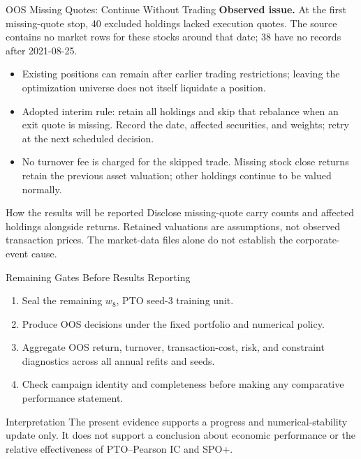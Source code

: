 \documentclass[aspectratio=169,xcolor=dvipsnames]{beamer}
\begin{document}
\begin{frame}{OOS Missing Quotes: Continue Without Trading}
    \small
    \textbf{Observed issue.} At the first missing-quote stop, 40 excluded
    holdings lacked execution quotes. The source contains no market rows for
    these stocks around that date; 38 have no records after 2021-08-25.
    \vspace{2pt}
    \begin{itemize}
        \item Existing positions can remain after earlier trading restrictions;
        leaving the optimization universe does not itself liquidate a position.
        \item Adopted interim rule: retain all holdings and skip that rebalance
        when an exit quote is missing. Record the date, affected securities,
        and weights; retry at the next scheduled decision.
        \item No turnover fee is charged for the skipped trade. Missing stock
        close returns retain the previous asset valuation; other holdings
        continue to be valued normally.
    \end{itemize}
    \vspace{2pt}
    \begin{block}{How the results will be reported}
    Disclose missing-quote carry counts and affected holdings alongside returns.
    Retained valuations are assumptions, not observed transaction prices.
    The market-data files alone do not establish the corporate-event cause.
    \end{block}
\end{frame}

\begin{frame}{Remaining Gates Before Results Reporting}
    \small
    \begin{enumerate}
        \item Seal the remaining $w_8$, PTO seed-3 training unit.
        \item Produce OOS decisions under the fixed portfolio and numerical policy.
        \item Aggregate OOS return, turnover, transaction-cost, risk, and
        constraint diagnostics across all annual refits and seeds.
        \item Check campaign identity and completeness before making any
        comparative performance statement.
    \end{enumerate}
    \vspace{8pt}
    \begin{block}{Interpretation}
    The present evidence supports a progress and numerical-stability update only.
    It does not support a conclusion about economic performance or the relative
    effectiveness of PTO--Pearson IC and SPO+.
    \end{block}
\end{frame}
\end{document}
